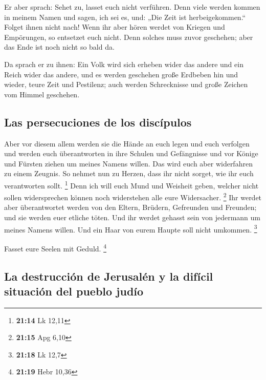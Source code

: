  Er aber sprach: Sehet zu, lasset euch nicht verführen.
Denn viele werden kommen in meinem Namen und sagen, ich sei es, und:
„Die Zeit ist herbeigekommen.`` Folget ihnen nicht nach! 
Wenn ihr aber hören werdet von Kriegen und Empörungen, so entsetzet euch
nicht. Denn solches muss zuvor geschehen; aber das Ende ist noch nicht
so bald da.

 Da sprach er zu ihnen: Ein Volk wird sich erheben wider
das andere und ein Reich wider das andere,  und es werden
geschehen große Erdbeben hin und wieder, teure Zeit und Pestilenz; auch
werden Schrecknisse und große Zeichen vom Himmel geschehen.

\hypertarget{las-persecuciones-de-los-discuxedpulos}{%
\subsection{Las persecuciones de los
discípulos}\label{las-persecuciones-de-los-discuxedpulos}}

 Aber vor diesem allem werden sie die Hände an euch legen
und euch verfolgen und werden euch überantworten in ihre Schulen und
Gefängnisse und vor Könige und Fürsten ziehen um meines Namens willen.
 Das wird euch aber widerfahren zu einem Zeugnis.
 So nehmet nun zu Herzen, dass ihr nicht sorget, wie ihr
euch verantworten sollt. \footnote{\textbf{21:14} Lk 12,11}
 Denn ich will euch Mund und Weisheit geben, welcher
nicht sollen widersprechen können noch widerstehen alle eure
Widersacher. \footnote{\textbf{21:15} Apg 6,10}  Ihr
werdet aber überantwortet werden von den Eltern, Brüdern, Gefreunden und
Freunden; und sie werden euer etliche töten.  Und ihr
werdet gehasst sein von jedermann um meines Namens willen.
 Und ein Haar von eurem Haupte soll nicht umkommen.
\footnote{\textbf{21:18} Lk 12,7}

 Fasset eure Seelen mit Geduld. \footnote{\textbf{21:19}
  Hebr 10,36}

\hypertarget{la-destrucciuxf3n-de-jerusaluxe9n-y-la-difuxedcil-situaciuxf3n-del-pueblo-juduxedo}{%
\subsection{La destrucción de Jerusalén y la difícil situación del
pueblo
judío}\label{la-destrucciuxf3n-de-jerusaluxe9n-y-la-difuxedcil-situaciuxf3n-del-pueblo-juduxedo}}

